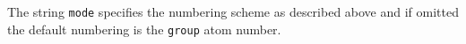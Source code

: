 The string {\tt mode} specifies the numbering scheme as described above and if omitted the
default numbering is the {\tt group} atom number.
%
%
%
%
%
%
%
%
